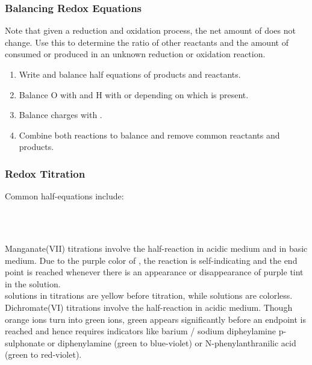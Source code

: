 \documentclass[../main]{subfiles}
\begin{document}
	\subsubsection{Balancing Redox Equations}

	Note that given a reduction and oxidation process, the net amount of  does not change. Use this to determine the ratio of other reactants and the amount of  consumed or produced in an unknown reduction or oxidation reaction.

	\begin{enumerate}
		\item Write and balance half equations of products and reactants.
		\item Balance O with  and H with  or  depending on which is present.
		\item Balance charges with .
		\item Combine both reactions to balance  and remove common reactants and products.
	\end{enumerate}

	\subsubsection{Redox Titration}

	Common half-equations include: \\

	\begin{center}
		 \\
		 \\
	\end{center}

	Manganate(VII) titrations involve the half-reaction  in acidic medium and  in basic medium. Due to the purple color of , the reaction is self-indicating and the end point is reached whenever there is an appearance or disappearance of purple tint in the solution.\\

	 solutions in  titrations are yellow before titration, while  solutions are colorless. \\

	Dichromate(VI) titrations involve the half-reaction  in acidic medium. Though orange  ions turn into green  ions, green appears significantly before an endpoint is reached and hence requires indicators like barium / sodium dipheylamine p-sulphonate or diphenylamine (green to blue-violet) or N-phenylanthranilic acid (green to red-violet). \\
\end{document}
